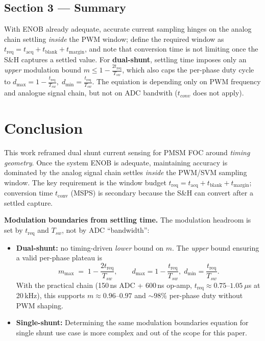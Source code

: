 \documentclass[conference]{IEEEtran}
\begin{document}
\subsection*{Section 3 — Summary}
With ENOB already adequate, accurate current sampling hinges on the analog chain settling \emph{inside} the PWM window; define the required window as
\( t_{\mathrm{req}} = t_{\mathrm{acq}} + t_{\mathrm{blank}} + t_{\mathrm{margin}} \),
and note that conversion time is not limiting once the S\&H captures a settled value. For \textbf{dual-shunt}, settling time imposes only an \emph{upper} modulation bound
\( \displaystyle m \le 1 - \frac{2 t_{\mathrm{req}}}{T_{sw}} \),
which also caps the per-phase duty cycle to
\( \displaystyle d_{\max}=1-\frac{t_{\mathrm{req}}}{T_{sw}},\; d_{\min}=\frac{t_{\mathrm{req}}}{T_{sw}} \). The equiation is depending only on PWM frequency and analogue signal chain, but not on ADC bandwith ($t_{conv}$ does not apply). 






\section{Conclusion}
This work reframed dual shunt current sensing for PMSM FOC around \emph{timing geometry}. Once the system ENOB is adequate, maintaining accuracy is dominated by the analog signal chain settles \emph{inside} the PWM/SVM sampling window. The key requirement is the window budget
\(t_{\mathrm{req}} = t_{\mathrm{acq}} + t_{\mathrm{blank}} + t_{\mathrm{margin}}\);
conversion time \(t_{\mathrm{conv}}\) (MSPS) is secondary because the S\&H can convert after a settled capture. 

\medskip
\noindent\textbf{Modulation boundaries from settling time.}
The modulation headroom is set by \(t_{\mathrm{req}}\) and \(T_{sw}\), not by ADC “bandwidth”:
\begin{itemize}
  \item \textbf{Dual-shunt:} no timing-driven \emph{lower} bound on \(m\). The \emph{upper} bound ensuring a valid per-phase plateau is
  \[
     m_{\max} \;=\; 1 - \frac{2 t_{\mathrm{req}}}{T_{sw}}, \qquad
     d_{\max}=1-\frac{t_{\mathrm{req}}}{T_{sw}},\; d_{\min}=\frac{t_{\mathrm{req}}}{T_{sw}}.
  \]
  With the practical chain (150\,ns ADC + 600\,ns op-amp, \(t_{\mathrm{req}}\!\approx\!0.75\text{–}1.05~\mu\)s at 20\,kHz), this supports \(m\!\approx\!0.96\text{–}0.97\) and \(\sim\!98\%\) per-phase duty without PWM shaping.
  \item \textbf{Single-shunt:} Determining the same modulation boundaries equation for single shunt use case is more complex and out of the scope for this paper.
\end{itemize}
\end{document}
